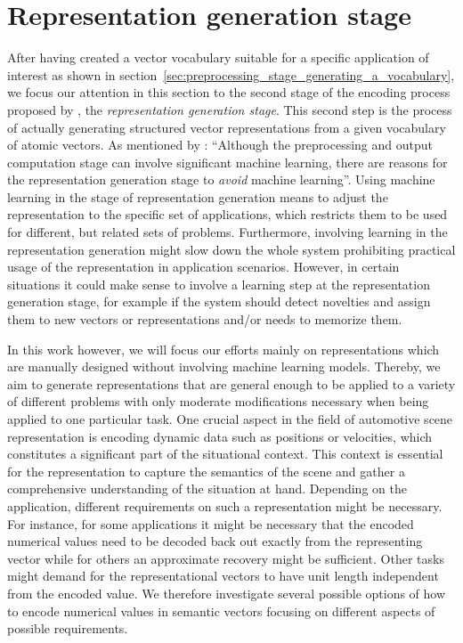 \section{Representation generation stage}%
\label{sec:representation_generation_stage}

After having created a vector vocabulary suitable for a specific application of interest as shown in section~\ref{sec:preprocessing_stage_generating_a_vocabulary}, we focus our attention in this section to the second stage of the encoding process proposed by \textcite{Gallant2013}, the \emph{representation generation stage}.
This second step is the process of actually generating structured vector representations from a given vocabulary of atomic vectors.
As mentioned by \textcite{Gallant2013}: \enquote{Although the preprocessing and output computation stage can involve significant machine learning, there are reasons for the representation generation stage to \emph{avoid} machine learning}.
Using machine learning in the stage of representation generation means to adjust the representation to the specific set of applications, which restricts them to be used for different, but related sets of problems.
Furthermore, involving learning in the representation generation might slow down the whole system prohibiting practical usage of the representation in application scenarios.
However, in certain situations it could make sense to involve a learning step at the representation generation stage, for example if the system should detect novelties and assign them to new vectors or representations and/or needs to memorize them.

In this work however, we will focus our efforts mainly on representations which are manually designed without involving machine learning models.
Thereby, we aim to generate representations that are general enough to be applied to a variety of different problems with only moderate modifications necessary when being applied to one particular task.
One crucial aspect in the field of automotive scene representation is encoding dynamic data such as positions or velocities, which constitutes a significant part of the situational context.
This context is essential for the representation to capture the semantics of the scene and gather a comprehensive understanding of the situation at hand.
Depending on the application, different requirements on such a representation might be necessary.
For instance, for some applications it might be necessary that the encoded numerical values need to be decoded back out exactly from the representing vector while for others an approximate recovery might be sufficient.
Other tasks might demand for the representational vectors to have unit length independent from the encoded value.
We therefore investigate several possible options of how to encode numerical values in semantic vectors focusing on different aspects of possible requirements.

